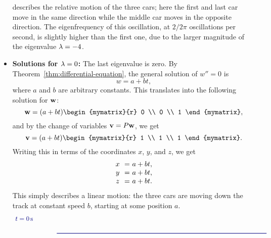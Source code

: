 \begin{solution}
\begin{itemize}
\begin{equation*}
    \end{equation*}
    describes the relative motion of the three cars; here the first
    and last car move in the same direction while the middle car moves
    in the opposite direction. The eigenfrequency of this oscillation,
    at $2/2\pi$ oscillations per second, is slightly higher than the
    first one, due to the larger magnitude of the eigenvalue
    $\lambda=-4$.
  \item \textbf{Solutions for $\lambda=0$:} The last eigenvalue is
    zero. By Theorem~\ref{thm:differential-equation}, the general
    solution of $w'' = 0$ is
    \begin{equation*}
      w = a+bt,
    \end{equation*}
    where $a$ and $b$ are arbitrary constants. This translates into
    the following solution for $\mbox{\bf w}$:
    \begin{equation*}
      \vect{w}
      = (a+bt)\begin{mymatrix}{r} 0 \\ 0 \\ 1 \end{mymatrix},
    \end{equation*}
    and by the change of variables $\mbox{\bf v} = P\mbox{\bf w}$, we get
    \begin{equation*}
      \vect{v} 
      = (a+bt)\begin{mymatrix}{r} 1 \\ 1 \\ 1 \end{mymatrix}.
    \end{equation*}
    Writing this in terms of the coordinates $x$, $y$, and $z$, we get
    \begin{equation*}
      \begin{array}{c@{~~}c@{~}l}
        x &=& a+bt, \\
        y &=& a+bt, \\
        z &=& a+bt. \\
      \end{array}
    \end{equation*}
    This simply describes a linear motion: the three cars are moving
    down the track at constant speed $b$, starting at some position
    $a$.
    \begin{equation*}
      \begin{tikzpicture}[scale=0.8, color=blue!50!black]
        \begin{scope}[yshift=0cm]
          \draw (-3,1) node[right] {$t=0\s$};
          \draw[thick] (0,0) -- (14.4,0);

\end{scope}
\end{tikzpicture}
\end{equation*}
\end{itemize}
\end{solution}
